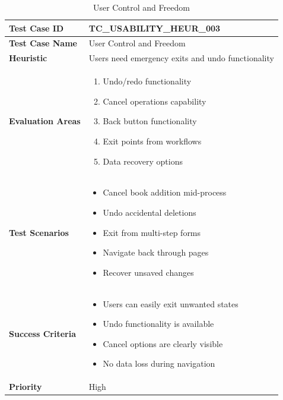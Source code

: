 \documentclass[12pt,a4paper]{article}
\begin{document}
\begin{longtable}{|p{3cm}|p{12cm}|}
\caption{User Control and Freedom} \\
\hline
\rowcolor{lightgray}
\textbf{Test Case ID} & \textbf{TC\_USABILITY\_HEUR\_003} \\
\hline
\textbf{Test Case Name} & User Control and Freedom \\
\hline
\textbf{Heuristic} & Users need emergency exits and undo functionality \\
\hline
\textbf{Evaluation Areas} & 
\begin{enumerate}[nosep]
    \item Undo/redo functionality
    \item Cancel operations capability
    \item Back button functionality
    \item Exit points from workflows
    \item Data recovery options
\end{enumerate} \\
\hline
\textbf{Test Scenarios} & 
\begin{itemize}[nosep]
    \item Cancel book addition mid-process
    \item Undo accidental deletions
    \item Exit from multi-step forms
    \item Navigate back through pages
    \item Recover unsaved changes
\end{itemize} \\
\hline
\textbf{Success Criteria} & 
\begin{itemize}[nosep]
    \item Users can easily exit unwanted states
    \item Undo functionality is available
    \item Cancel options are clearly visible
    \item No data loss during navigation
\end{itemize} \\
\hline
\textbf{Priority} & High \\
\hline
\end{longtable}
\end{document}
